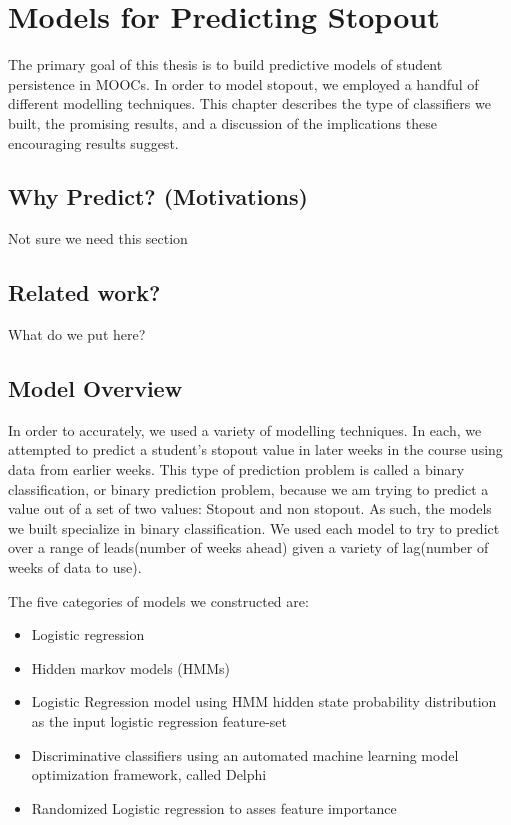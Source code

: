 \chapter{Models for Predicting Stopout}\label{chap:models}
The primary goal of this thesis is to build predictive models of student persistence in MOOCs. In order to model stopout, we employed a handful of different modelling techniques. This chapter describes the type of classifiers we built, the promising results, and a discussion of the implications these encouraging results suggest.

\section{Why Predict? (Motivations)}
Not sure we need this section

\section{Related work?}
What do we put here?

\section{Model Overview}
In order to accurately, we used a variety of modelling techniques. In each, we attempted to predict a student's stopout value in later weeks in the course using data from earlier weeks. This type of prediction problem is called a binary classification, or binary prediction problem, because we am trying to predict a value out of a set of two values: Stopout and non stopout. As such, the models we built specialize in binary classification. We used each model to try to predict over a range of leads(number of weeks ahead) given a variety of lag(number of weeks of data to use). 

The five categories of models we constructed are:

\begin{itemize}
\item Logistic regression 
\item Hidden markov models (HMMs)
\item Logistic Regression model using HMM hidden state probability distribution as the input logistic regression feature-set
\item Discriminative classifiers using an automated machine learning model optimization framework, called Delphi
\item Randomized Logistic regression to asses feature importance
\end{itemize}